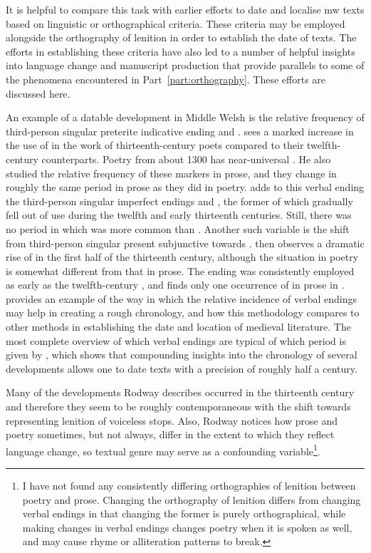 It is helpful to compare this task with earlier efforts to date and localise \gls{mw} texts based on linguistic or orthographical criteria. These criteria may be employed alongside the orthography of lenition in order to establish the date of texts. The efforts in establishing these criteria have also led to a number of helpful insights into language change and manuscript production that provide parallels to some of the phenomena encountered in Part~\ref{part:orthography}. These efforts are discussed here.


An example of a datable development in Middle Welsh is the relative frequency of third-person singular preterite indicative ending  and . \Textcite{Rod_Datable98} sees a marked increase in the use of  in the work of thirteenth-century poets compared to their twelfth-century counterparts. Poetry from about 1300 has near-universal . He also studied the relative frequency of these markers in prose, and they change in roughly the same period in prose as they did in poetry. \Textcite[68--71]{Rod_Two03} adds to this verbal ending the third-person singular imperfect endings  and \ei, the former of which gradually fell out of use during the twelfth and early thirteenth centuries. Still, there was no period in which  was more common than \ei. Another such variable is the shift from third-person singular present subjunctive  towards . \Textcite[71--73]{Rod_Two03} then observes a dramatic rise of  in the first half of the thirteenth century, although the situation in poetry is somewhat different from that in prose. The ending  was consistently employed as early as the twelfth-century , and \textcite[73]{Rod_Two03} finds only one occurrence of  in prose in . \Textcite{Rod_Where07} provides an example of the way in which the relative incidence of verbal endings may help in creating a rough chronology, and how this methodology compares to other methods in establishing the date and location of medieval literature. The most complete overview of which verbal endings are typical of which period is given by \textcite[166]{rodway_dating_2013}, which shows that compounding insights into the chronology of several developments allows one to date texts with a precision of roughly half a century.

Many of the developments Rodway describes occurred in the thirteenth century and therefore they seem to be roughly contemporaneous with the shift towards representing lenition of voiceless stops. Also, Rodway notices how prose and poetry sometimes, but not always, differ in the extent to which they reflect language change, so textual genre may serve as a confounding variable\footnote{I have not found any consistently differing orthographies of lenition between poetry and prose. Changing the orthography of lenition differs from changing verbal endings in that changing the former is purely orthographical, while making changes in verbal endings changes poetry when it is spoken as well, and may cause rhyme or alliteration patterns to break.}.

